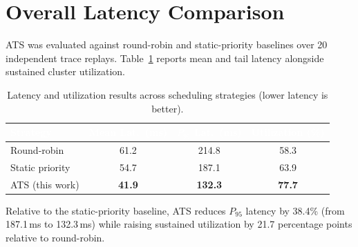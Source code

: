 \section{Overall Latency Comparison}

ATS was evaluated against round-robin and static-priority baselines over
20 independent trace replays. Table~\ref{tab:results} reports mean and
tail latency alongside sustained cluster utilization.

\begin{table}[h]
\centering
\caption{Latency and utilization results across scheduling strategies (lower latency is better).}
\label{tab:results}
\begin{tabular}{@{}lccc@{}}
\toprule
\rowcolor{yonseiblue}
\textcolor{white}{\textbf{Strategy}} & \textcolor{white}{\textbf{Mean Lat.\ (ms)}} & \textcolor{white}{\textbf{$P_{95}$ Lat.\ (ms)}} & \textcolor{white}{\textbf{Utilization (\%)}}\\
\midrule
Round-robin & 61.2 & 214.8 & 58.3\\
\rowcolor{paletint}
Static priority & 54.7 & 187.1 & 63.9\\
ATS (this work) & \textbf{41.9} & \textbf{132.3} & \textbf{77.7}\\
\bottomrule
\end{tabular}
\end{table}

Relative to the static-priority baseline, ATS reduces $P_{95}$ latency by
38.4\% (from 187.1\,ms to 132.3\,ms) while raising sustained utilization
by 21.7 percentage points relative to round-robin.
